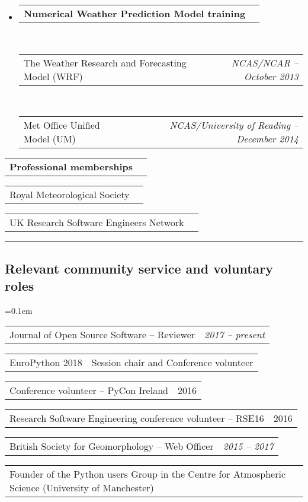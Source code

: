 \documentclass[10.5pt,a4]{article}
\makeatletter
\newenvironment{indentsection}[1]%
{\begin{list}{}%
	{\setlength{\leftmargin}{#1}}%
	\item[]%
}
{\end{list}}
\newcommand{\headerrow}[2]
{\begin{tabular*}{\linewidth}{l@{\extracolsep{\fill}}r}
	#1 &
	#2 \\
\end{tabular*}}
\makeatother
\begin{document}
\begin{itemize}
	\item 
	\headerrow
		{\textbf{Numerical Weather Prediction Model training}}
		{}
	\\
		\headerrow
		{The Weather Research and Forecasting Model (WRF)} 
		{\textit{NCAS/NCAR -- October 2013}}
  \\
		\headerrow
		{Met Office Unified Model (UM)}
		{\textit{NCAS/University of Reading -- December 2014}}
\end{itemize}

%

\begin{itemize*}
	\item 
	\headerrow
		{\textbf{Professional memberships}}
		{}
	\headerrow {Royal Meteorological Society}{}
	\headerrow {UK Research Software Engineers Network}{}

\end{itemize*}





\hrule
\vspace{-0.4em}
\subsection*{Relevant community service and voluntary roles}
	\parskip=0.1em
\begin{itemize*}
	\item
	\headerrow
	  {Journal of Open Source Software -- Reviewer}
	  {\textit{2017 -- present}}

	\item 
	\headerrow 
	  {EuroPython 2018}
	  {Session chair and Conference volunteer}
	  
	\item 
	\headerrow 
	  {Conference volunteer -- PyCon Ireland}
	  {2016}

	\item 
	\headerrow 
	  {Research Software Engineering conference volunteer -- RSE16}
	  {2016}
	  
	\item 
	\headerrow 
	  {British Society for Geomorphology -- Web Officer}
	  {\textit{2015 -- 2017}}

	\item 
	\headerrow 
	  {Founder of the Python users Group in the Centre for Atmospheric Science (University of Manchester)}
	  {\textit{}}



\end{itemize*}



%
%
%
%
\end{document}
